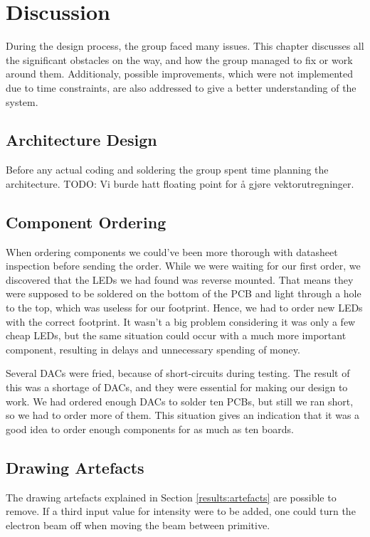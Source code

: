 \chapter{Discussion}

During the design process, the group faced many issues. This chapter discusses all the significant obstacles on the way, and how the group managed to fix or work around them. Additionaly, possible improvements, which were not implemented due to time constraints, are also addressed to give a better understanding of the system.

\section{Architecture Design}
Before any actual coding and soldering the group spent time planning the architecture.
TODO: Vi burde hatt floating point for å gjøre vektorutregninger.

%

\section{Component Ordering}
When ordering components we could've been more thorough with datasheet inspection before sending the order. While we were waiting for our first order, we discovered that the LEDs we had found was reverse mounted. That means they were supposed to be soldered on the bottom of the PCB and light through a hole to the top, which was useless for our footprint. Hence, we had to order new LEDs with the correct footprint. It wasn't a big problem considering it was only a few cheap LEDs, but the same situation could occur with a much more important component, resulting in delays and unnecessary spending of money.

Several DACs were fried, because of short-circuits during testing. The result of this was a shortage of DACs, and they were essential for making our design to work. We had ordered enough DACs to solder ten PCBs, but still we ran short, so we had to order more of them. This situation gives an indication that it was a good idea to order enough components for as much as ten boards.



\section{Drawing Artefacts}
\label{discussion:artefacts}
The drawing artefacts explained in Section \ref{results:artefacts} are possible to remove.
If a third input value for intensity were to be added, one could turn the electron beam off when moving the beam between primitive.

